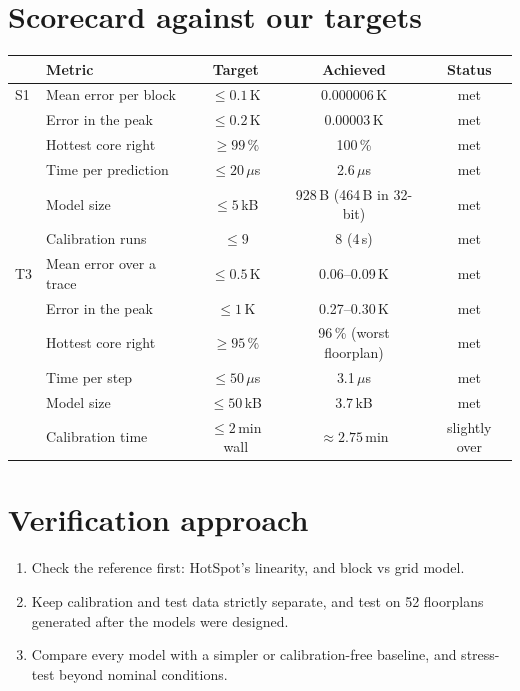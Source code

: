 \documentclass[11pt,a4paper]{article}
\newcommand{\us}{\,$\mu$s}
\begin{document}
\section{Scorecard against our targets}
\begin{center}
\small
\begin{tabular}{@{}l l c c c@{}}
\toprule
& Metric & Target & Achieved & Status \\
\midrule
S1 & Mean error per block & $\le 0.1$\,K & 0.000006\,K & met \\
   & Error in the peak & $\le 0.2$\,K & 0.00003\,K & met \\
   & Hottest core right & $\ge 99\,\%$ & 100\,\% & met \\
   & Time per prediction & $\le 20$\us & 2.6\us & met \\
   & Model size & $\le 5$\,kB & 928\,B (464\,B in 32-bit) & met \\
   & Calibration runs & $\le 9$ & 8 (4\,s) & met \\
\midrule
T3 & Mean error over a trace & $\le 0.5$\,K & 0.06--0.09\,K & met \\
   & Error in the peak & $\le 1$\,K & 0.27--0.30\,K & met \\
   & Hottest core right & $\ge 95\,\%$ & 96\,\% (worst floorplan) & met \\
   & Time per step & $\le 50$\us & 3.1\us & met \\
   & Model size & $\le 50$\,kB & 3.7\,kB & met \\
   & Calibration time & $\le 2$\,min wall & $\approx 2.75$\,min & slightly over \\
\bottomrule
\end{tabular}
\end{center}

\section{Verification approach}
\begin{enumerate}
  \item Check the reference first: HotSpot's linearity, and block vs grid model.
  \item Keep calibration and test data strictly separate, and test on 52 floorplans generated
        after the models were designed.
  \item Compare every model with a simpler or calibration-free baseline, and stress-test beyond
        nominal conditions.
\end{enumerate}
\end{document}
